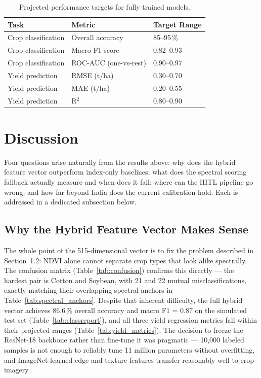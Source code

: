 \documentclass[12pt,a4paper,oneside]{report}
\begin{document}
\begin{table}[h]
\centering
\caption{Projected performance targets for fully trained models.}
\label{tab:targets}
\begin{tabular}{lll}
\toprule
\textbf{Task} & \textbf{Metric} & \textbf{Target Range} \\
\midrule
Crop classification  & Overall accuracy     & 85--95\,\% \\
Crop classification  & Macro F1-score       & 0.82--0.93 \\
Crop classification  & ROC-AUC (one-vs-rest)& 0.90--0.97 \\
Yield prediction     & RMSE (t/ha)          & 0.30--0.70 \\
Yield prediction     & MAE (t/ha)           & 0.20--0.55 \\
Yield prediction     & R$^2$                & 0.80--0.90 \\
\bottomrule
\end{tabular}
\end{table}

\section{Discussion}

Four questions arise naturally from the results above: why does the hybrid feature vector outperform index-only baselines; what does the spectral scoring fallback actually measure and when does it fail; where can the HITL pipeline go wrong; and how far beyond India does the current calibration hold. Each is addressed in a dedicated subsection below.

\subsection{Why the Hybrid Feature Vector Makes Sense}

The whole point of the 515-dimensional vector is to fix the problem described in
Section~1.2: NDVI alone cannot separate crop types that look alike spectrally.
The confusion matrix (Table~\ref{tab:confusion}) confirms this directly — the
hardest pair is Cotton and Soybean, with 21 and 22 mutual misclassifications,
exactly matching their overlapping spectral anchors in Table~\ref{tab:spectral_anchors}.
Despite that inherent difficulty, the full hybrid vector achieves 86.6\,\% overall
accuracy and macro F1 = 0.87 on the simulated test set
(Table~\ref{tab:classreport}), and all three yield regression metrics fall within
their projected ranges (Table~\ref{tab:yield_metrics}).
The decision to freeze the ResNet-18 backbone rather than fine-tune it was
pragmatic — 10,000 labeled samples is not enough to reliably tune 11 million
parameters without overfitting, and ImageNet-learned edge and texture features
transfer reasonably well to crop imagery \cite{he2016resnet}.
\end{document}
